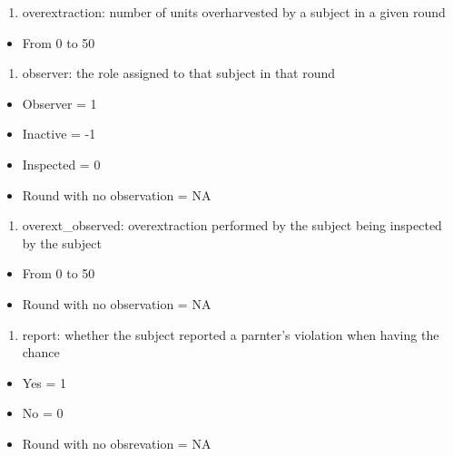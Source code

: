 \documentclass[
]{article}
\providecommand{\tightlist}{%
  \setlength{\itemsep}{0pt}\setlength{\parskip}{0pt}}
\begin{document}
\begin{enumerate}
\def\labelenumi{\arabic{enumi})}
\setcounter{enumi}{6}
\tightlist
\item
  overextraction: number of units overharvested by a subject in a given
  round
\end{enumerate}

\begin{itemize}
\tightlist
\item
  From 0 to 50
\end{itemize}

\begin{enumerate}
\def\labelenumi{\arabic{enumi})}
\setcounter{enumi}{7}
\tightlist
\item
  observer: the role assigned to that subject in that round
\end{enumerate}

\begin{itemize}
\tightlist
\item
  Observer = 1
\item
  Inactive = -1
\item
  Inspected = 0
\item
  Round with no observation = NA
\end{itemize}

\begin{enumerate}
\def\labelenumi{\arabic{enumi})}
\setcounter{enumi}{8}
\tightlist
\item
  overext\_observed: overextraction performed by the subject being
  inspected by the subject
\end{enumerate}

\begin{itemize}
\tightlist
\item
  From 0 to 50
\item
  Round with no observation = NA
\end{itemize}

\begin{enumerate}
\def\labelenumi{\arabic{enumi})}
\setcounter{enumi}{9}
\tightlist
\item
  report: whether the subject reported a parnter's violation when having
  the chance
\end{enumerate}

\begin{itemize}
\tightlist
\item
  Yes = 1
\item
  No = 0
\item
  Round with no obsrevation = NA
\end{itemize}
\end{document}
